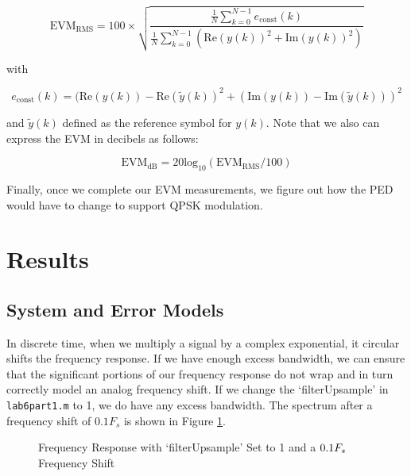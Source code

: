 \documentclass{article}
\begin{document}
\begin{equation}
	\text{EVM}_\text{RMS} = 100 \times \sqrt{\frac{\frac{1}{N}\sum_{k=0}^{N-1}{e_\text{const}(k)}}{\frac{1}{N}\sum_{k=0}^{N-1}{(\text{Re}(y(k))^2 + \text{Im}(y(k))^2)}}}
\end{equation}

\noindent with

\begin{equation}
	e_\text{const}(k) = (\text{Re}(y(k)) - \text{Re}(\tilde{y}(k))^2 + (\text{Im}(y(k)) - \text{Im}(\tilde{y}(k)))^2
\end{equation}

\noindent and $\tilde{y}(k)$ defined as the reference symbol for $y(k)$. Note that we also can express the EVM in decibels as follows:

\begin{equation}
	\text{EVM}_\text{dB} = 20\text{log}_{10}(\text{EVM}_\text{RMS}/100)
\end{equation}

\noindent Finally, once we complete our EVM measurements, we figure out how the PED would have to change to support QPSK modulation.

\section{Results}

\subsection{System and Error Models}

In discrete time, when we multiply a signal by a complex exponential, it circular shifts the frequency response. If we have enough excess bandwidth, we can ensure that the significant portions of our frequency response do not wrap and in turn correctly model an analog frequency shift. If we change the `filterUpsample' in \texttt{lab6part1.m} to 1, we do have any excess bandwidth. The spectrum after a frequency shift of $0.1F_s$ is shown in Figure \ref{fig::psd_upsample_1}.

\begin{figure}[H]
	\centerline{}
	\caption{Frequency Response with `filterUpsample' Set to 1 and a $\protect{0.1F_s}$ Frequency Shift}
	\label{fig::psd_upsample_1}
\end{figure}
\end{document}
